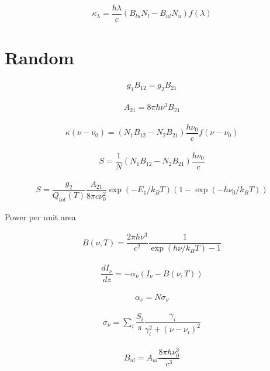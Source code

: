 \begin{align}
\kappa_\lambda  = \dfrac{h \lambda }{c}  
\left(  B_{lu} N_l -  B_{ul} N_u \right) f(\lambda)
\end{align}


\section{Random}

\begin{align}
	g_1 B_{12} = g_2 B_{21}
\end{align}

\begin{align}
	A_{21} = 8 \pi h \nu^3 B_{21}
\end{align}

\begin{align}
	\kappa(\nu - \nu_0)	= (N_1 B_{12} - N_2 B_{21}) \dfrac{h \nu_0}{c} f(\nu - \nu_0)
\end{align}

\begin{align}
	S = \dfrac{1}{N} (N_1 B_{12} - N_2 B_{21}) \dfrac{h \nu_0}{c}
\end{align}

\begin{align}
	S = \dfrac{g_2}{Q_{tot}(T)} \dfrac{A_{21}}{8  \pi c \nu_0^2} \exp(- E_1 / k_BT)
		(1 - \exp(- h \nu_0 / k_BT))
\end{align}

Power per unit area

\begin{align}
	B(\nu, T) = \dfrac{2 \pi h \nu^3}{c^2} \dfrac{1}{ \exp(h \nu /  k_B T) - 1}
\end{align}


\begin{align}
	\dfrac{d I_{\nu}}{dz} = -\alpha_{\nu}	 (I_{\nu} - B(\nu, T))
\end{align}

\begin{align}
	\alpha_{\nu} = N \sigma_{\nu}
\end{align}

\begin{align}
	\sigma_{\nu} = \sum_i \dfrac{S_i}{\pi} \dfrac{\gamma_i}{\gamma_i^2 + (\nu - \nu_i)^2}
\end{align}


\begin{align}
	B_{ul} = A_{ul} \dfrac{8 \pi h \nu_0^3}{c^3	}
\end{align}


